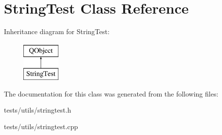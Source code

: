 \hypertarget{classStringTest}{}\section{String\+Test Class Reference}
\label{classStringTest}
Inheritance diagram for String\+Test\+:\begin{figure}[H]
\begin{center}
\leavevmode
\includegraphics[height=2.000000cm]{d1/d6b/classStringTest}
\end{center}
\end{figure}


The documentation for this class was generated from the following files\+:\begin{DoxyCompactItemize}
\item 
tests/utils/stringtest.\+h\item 
tests/utils/stringtest.\+cpp\end{DoxyCompactItemize}
